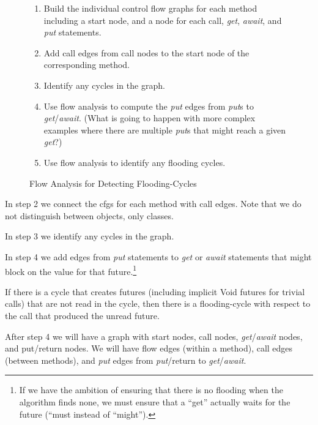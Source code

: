 \documentclass[12pt]{article}%
\begin{document}
\begin{figure}
\begin{shaded}
\begin{enumerate}
\item Build the individual control flow graphs for each method including a start node, and a node for each call, \emph{get}, \emph{await}, and \emph{put} statements.
\item Add call edges from call nodes to the start node of the corresponding method.
\item Identify any cycles in the graph.
\item Use flow analysis to compute the \emph{put} edges from \emph{put}s to \emph{get}/\emph{await}. (What is going to happen with more complex examples
where there are multiple \emph{put}s that might reach a given \emph{get}?)
\item Use flow analysis to identify any flooding cycles.
\end{enumerate}\end{shaded}%
\caption{\label{flow-analysis}
Flow Analysis for Detecting Flooding-Cycles}
\end{figure}

In step 2 we connect the cfgs for each method with call edges. Note that we do not distinguish between objects, only classes.

In step 3 we identify any cycles in the graph.

In step 4 we add edges from \emph{put} statements to \emph{get} or \emph{await} statements that might block on the value for that future.\footnote{If we have the ambition of ensuring that 
there is no flooding when the algorithm finds none,
we must ensure that a ``get'' actually waits for the future
(``must instead of ``might'').}

If there is a cycle that creates futures (including implicit Void futures for trivial calls) that are not read
in the cycle, then there is a flooding-cycle with respect to the call that produced the unread future.

After step 4 we will have a graph with start nodes, call nodes, \emph{get}/\emph{await} nodes, and
put/return nodes. We will have flow edges (within a method), call edges (between methods), and \emph{put} edges from \emph{put}/return
to \emph{get}/\emph{await}.
\end{document}
